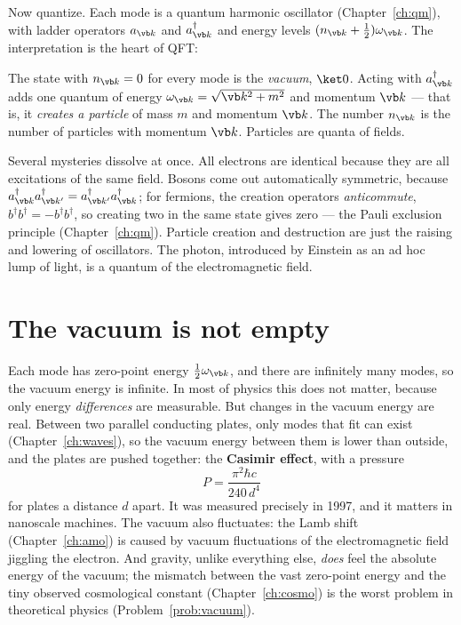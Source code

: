 Now quantize. Each mode is a quantum harmonic oscillator (Chapter~\ref{ch:qm}), with ladder operators $a_{\vb k}$ and $a^\dagger_{\vb k}$ and energy levels $(n_{\vb k} + \tfrac12)\omega_{\vb k}$. The interpretation is the heart of QFT:

\begin{keyidea}
The state with $n_{\vb k} = 0$ for every mode is the \emph{vacuum}, $\ket0$. Acting with $a^\dagger_{\vb k}$ adds one quantum of energy $\omega_{\vb k} = \sqrt{\vb k^2+m^2}$ and momentum $\vb k$ --- that is, it \emph{creates a particle} of mass $m$ and momentum $\vb k$. The number $n_{\vb k}$ is the number of particles with momentum $\vb k$. Particles are quanta of fields.
\end{keyidea}

Several mysteries dissolve at once. All electrons are identical because they are all excitations of the same field. Bosons come out automatically symmetric, because $a^\dagger_{\vb k}a^\dagger_{\vb k'} = a^\dagger_{\vb k'}a^\dagger_{\vb k}$; for fermions, the creation operators \emph{anticommute}, $b^\dagger b^\dagger = -b^\dagger b^\dagger$, so creating two in the same state gives zero --- the Pauli exclusion principle (Chapter~\ref{ch:qm}). Particle creation and destruction are just the raising and lowering of oscillators. The photon, introduced by Einstein as an ad hoc lump of light, is a quantum of the electromagnetic field.

\section{The vacuum is not empty}

Each mode has zero-point energy $\tfrac12\omega_{\vb k}$, and there are infinitely many modes, so the vacuum energy is infinite. In most of physics this does not matter, because only energy \emph{differences} are measurable. But changes in the vacuum energy are real. Between two parallel conducting plates, only modes that fit can exist (Chapter~\ref{ch:waves}), so the vacuum energy between them is lower than outside, and the plates are pushed together: the \textbf{Casimir effect}, with a pressure
\[
  P = \frac{\pi^2\hbar c}{240\,d^4}
\]
for plates a distance $d$ apart. It was measured precisely in 1997, and it matters in nanoscale machines. The vacuum also fluctuates: the Lamb shift (Chapter~\ref{ch:amo}) is caused by vacuum fluctuations of the electromagnetic field jiggling the electron. And gravity, unlike everything else, \emph{does} feel the absolute energy of the vacuum; the mismatch between the vast zero-point energy and the tiny observed cosmological constant (Chapter~\ref{ch:cosmo}) is the worst problem in theoretical physics (Problem~\ref{prob:vacuum}).

